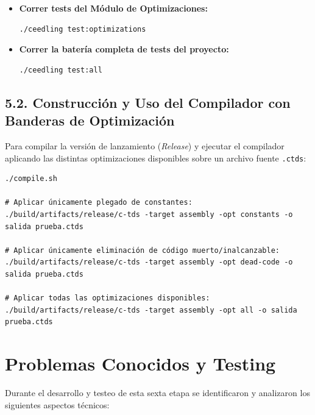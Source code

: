\documentclass[12pt, a4paper]{article}
\begin{document}
\begin{itemize}
    \item \textbf{Correr tests del Módulo de Optimizaciones:}
\begin{verbatim}
./ceedling test:optimizations
\end{verbatim}
    \item \textbf{Correr la batería completa de tests del proyecto:}
\begin{verbatim}
./ceedling test:all
\end{verbatim}
\end{itemize}

\subsection*{5.2. Construcción y Uso del Compilador con Banderas de Optimización}
Para compilar la versión de lanzamiento (\textit{Release}) y ejecutar el compilador aplicando las distintas optimizaciones disponibles sobre un archivo fuente \texttt{.ctds}:
{\footnotesize
\begin{verbatim}
./compile.sh

# Aplicar únicamente plegado de constantes:
./build/artifacts/release/c-tds -target assembly -opt constants -o salida prueba.ctds

# Aplicar únicamente eliminación de código muerto/inalcanzable:
./build/artifacts/release/c-tds -target assembly -opt dead-code -o salida prueba.ctds

# Aplicar todas las optimizaciones disponibles:
./build/artifacts/release/c-tds -target assembly -opt all -o salida prueba.ctds
\end{verbatim}
}

\section{Problemas Conocidos y Testing}
Durante el desarrollo y testeo de esta sexta etapa se identificaron y analizaron los siguientes aspectos técnicos:
\end{document}
